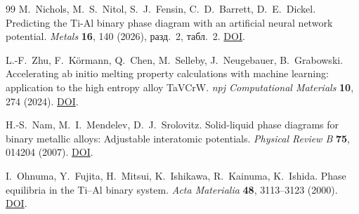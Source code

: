 \documentclass[11pt,a4paper]{article}
\begin{document}
\begin{thebibliography}{99}
M.~Nichols, M.~S.~Nitol, S.~J.~Fensin, C.~D.~Barrett, D.~E.~Dickel.
Predicting the Ti-Al binary phase diagram with an artificial neural network potential.
\emph{Metals} \textbf{16}, 140 (2026), разд.~2, табл.~2.
\href{https://doi.org/10.3390/met16020140}{DOI}.

L.-F.~Zhu, F.~Körmann, Q.~Chen, M.~Selleby, J.~Neugebauer, B.~Grabowski.
Accelerating ab initio melting property calculations with machine learning:
application to the high entropy alloy TaVCrW.
\emph{npj Computational Materials} \textbf{10}, 274 (2024).
\href{https://doi.org/10.1038/s41524-024-01464-7}{DOI}.

H.-S.~Nam, M.~I.~Mendelev, D.~J.~Srolovitz.
Solid-liquid phase diagrams for binary metallic alloys: Adjustable interatomic potentials.
\emph{Physical Review B} \textbf{75}, 014204 (2007).
\href{https://doi.org/10.1103/PhysRevB.75.014204}{DOI}.

I.~Ohnuma, Y.~Fujita, H.~Mitsui, K.~Ishikawa, R.~Kainuma, K.~Ishida.
Phase equilibria in the Ti--Al binary system.
\emph{Acta Materialia} \textbf{48}, 3113--3123 (2000).
\href{https://doi.org/10.1016/S1359-6454(00)00118-X}{DOI}.

\end{thebibliography}
\end{document}
